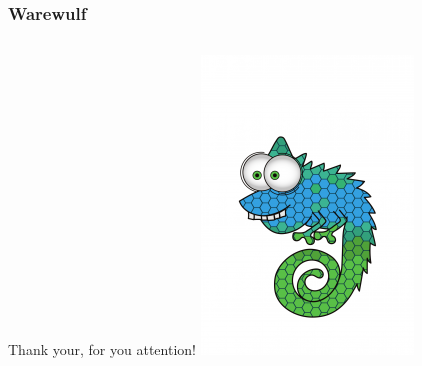 \documentclass[aspectratio=169]{beamer}
\begin{document}
\begin{frame}[fragile]
\frametitle{Warewulf}
\begin{columns}
Thank your, for you attention!
\includegraphics[width=.8\linewidth]{vector-chameleon-213x300}
\end{columns}
\end{frame}
\end{document}
